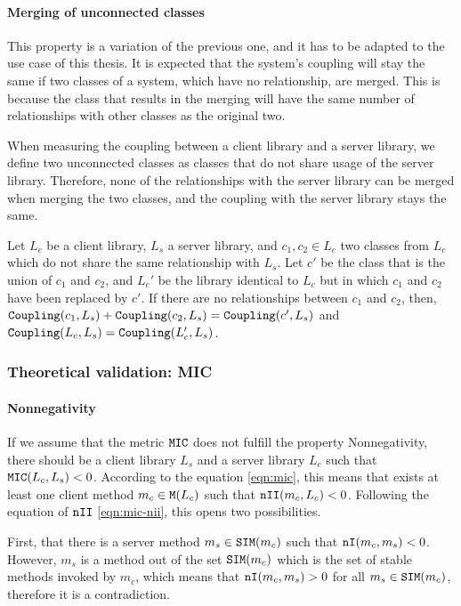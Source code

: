 \paragraph{Merging of unconnected classes}
This property is a variation of the previous one, and it has to be adapted to the use case of this thesis. It is expected that the system's coupling will stay the same if two classes of a system, which have no relationship, are merged. This is because the class that results in the merging will have the same number of relationships with other classes as the original two.

When measuring the coupling between a client library and a server library, we define two unconnected classes as classes that do not share usage of the server library. Therefore, none of the relationships with the server library can be merged when merging the two classes, and the coupling with the server library stays the same.

Let $L_c$ be a client library, $L_s$ a server library, and $c_1, c_2 \in L_c$ two classes from $L_c$ which do not share the same relationship with $L_s$. Let $c'$ be the class that is the union of  $c_1$ and $c_2$, and $L_c'$ be the library identical to $L_c$ but in which $c_1$ and $c_2$ have been replaced by $c'$. If there are no relationships between $c_1$ and $c_2$, then, $\verb|Coupling|(c_1, L_s) + \verb|Coupling|(c_2, L_s) = \verb|Coupling|(c', L_s)$ and $\verb|Coupling|(L_c, L_s) = \verb|Coupling|(L_c', L_s)$.

\subsubsection{Theoretical validation: MIC}

\paragraph{Nonnegativity}
If we assume that the metric $\verb|MIC|$ does not fulfill the property Nonnegativity, there should be a client library $L_s$ and a server library $L_c$ such that $\verb|MIC|(L_c, L_s) < 0$.
According to the equation \ref{eqn:mic}, this means that exists at least one client method $m_c \in \verb|M|(L_c)$ such that $\verb|nII|(m_c, L_c) < 0$. Following the equation of $\verb|nII|$ \ref{eqn:mic-nii}, this opens two possibilities.

First, that there is a server method $m_s \in \verb|SIM|(m_c)$ such that $\verb|nI|(m_c, m_s) < 0$. However, $m_s$ is a method out of the set $\verb|SIM|(m_c)$ which is the set of stable methods invoked by $m_c$, which means that $\verb|nI|(m_c, m_s) > 0$ for all $m_s \in \verb|SIM|(m_c)$, therefore it is a contradiction.


